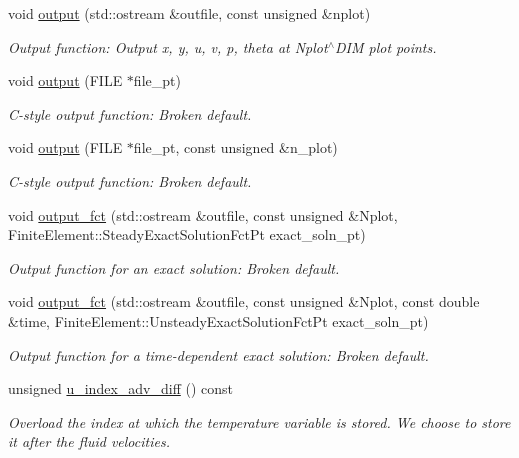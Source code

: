 \begin{DoxyCompactItemize}
void \hyperlink{classoomph_1_1BuoyantQCrouzeixRaviartElement_a855783400ac22a61e151d1611ad8e47e}{output} (std\+::ostream \&outfile, const unsigned \&nplot)
\begin{DoxyCompactList}\small\item\em Output function\+: Output x, y, u, v, p, theta at Nplot$^\wedge$\+D\+IM plot points. \end{DoxyCompactList}\item 
void \hyperlink{classoomph_1_1BuoyantQCrouzeixRaviartElement_a9ba77409f12b80862262f6695829055b}{output} (F\+I\+LE $\ast$file\+\_\+pt)
\begin{DoxyCompactList}\small\item\em C-\/style output function\+: Broken default. \end{DoxyCompactList}\item 
void \hyperlink{classoomph_1_1BuoyantQCrouzeixRaviartElement_a48039bbb2f32897b70fb0858ff739516}{output} (F\+I\+LE $\ast$file\+\_\+pt, const unsigned \&n\+\_\+plot)
\begin{DoxyCompactList}\small\item\em C-\/style output function\+: Broken default. \end{DoxyCompactList}\item 
void \hyperlink{classoomph_1_1BuoyantQCrouzeixRaviartElement_ad36c2a18f2de8b00f76baccc15b768c2}{output\+\_\+fct} (std\+::ostream \&outfile, const unsigned \&Nplot, Finite\+Element\+::\+Steady\+Exact\+Solution\+Fct\+Pt exact\+\_\+soln\+\_\+pt)
\begin{DoxyCompactList}\small\item\em Output function for an exact solution\+: Broken default. \end{DoxyCompactList}\item 
void \hyperlink{classoomph_1_1BuoyantQCrouzeixRaviartElement_ae1c6dc6850532af9ec618415ba31e053}{output\+\_\+fct} (std\+::ostream \&outfile, const unsigned \&Nplot, const double \&time, Finite\+Element\+::\+Unsteady\+Exact\+Solution\+Fct\+Pt exact\+\_\+soln\+\_\+pt)
\begin{DoxyCompactList}\small\item\em Output function for a time-\/dependent exact solution\+: Broken default. \end{DoxyCompactList}\item 
unsigned \hyperlink{classoomph_1_1BuoyantQCrouzeixRaviartElement_acf5fa44f694c5374c61a964020437bf4}{u\+\_\+index\+\_\+adv\+\_\+diff} () const
\begin{DoxyCompactList}\small\item\em Overload the index at which the temperature variable is stored. We choose to store it after the fluid velocities. \end{DoxyCompactList}\item 

\end{DoxyCompactItemize}
